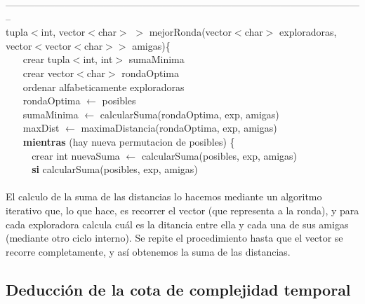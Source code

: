 --------------------------------------------------------------------------------------------------------------\\
tupla$<$int, vector$<$char$>$ $>$ mejorRonda(vector$<$char$>$ exploradoras, vector$<$vector$<$char$>>$ amigas)\{ \\
$~~~~~~~~$crear tupla$<$int, int$>$ sumaMinima \\
$~~~~~~~~$crear vector$<$char$>$ rondaOptima  \\
$~~~~~~~~$ordenar alfabeticamente exploradoras  \\
$~~~~~~~~$rondaOptima $\leftarrow$ posibles \\
$~~~~~~~~$sumaMinima $\leftarrow$ calcularSuma(rondaOptima, exp, amigas)  \\
$~~~~~~~~$maxDist $\leftarrow$ maximaDistancia(rondaOptima, exp, amigas) \\
$~~~~~~~~$\textbf{mientras} (hay nueva permutacion de posibles) \{  \\
$~~~~~~~~~~~~$crear int nuevaSuma $\leftarrow$ calcularSuma(posibles, exp, amigas)  \\
$~~~~~~~~~~~~$\textbf{si} calcularSuma(posibles, exp, amigas)  \\
\\

El calculo de la suma de las distancias lo hacemos mediante un algoritmo iterativo que, lo que hace, es recorrer el vector
(que representa a la ronda), y para cada exploradora calcula cuál es la ditancia entre ella y cada una de sus amigas (mediante 
otro ciclo interno). Se repite el procedimiento hasta que el vector se recorre completamente, y así obtenemos la suma de las distancias.  


\subsection{Deducción de la cota de complejidad temporal}

